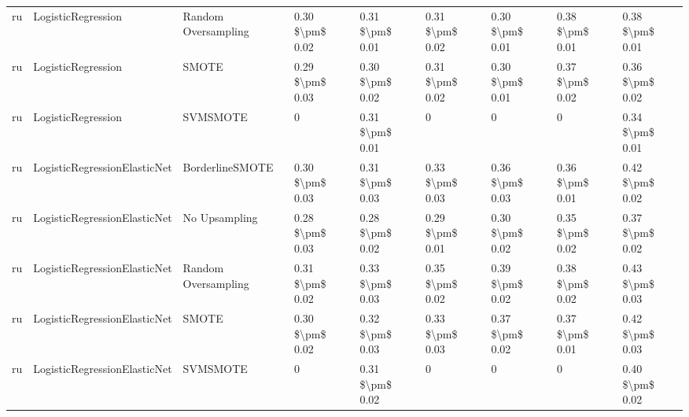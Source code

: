 \begin{tabular}{lllllllll}
      ru &              LogisticRegression &           Random Oversampling & 0.30 \$\textbackslash pm\$ 0.02 &           0.31 \$\textbackslash pm\$ 0.01 &       0.31 \$\textbackslash pm\$ 0.02 &        0.30 \$\textbackslash pm\$ 0.01 &                         0.38 \$\textbackslash pm\$ 0.01 &     0.38 \$\textbackslash pm\$ 0.01 \\
      ru &              LogisticRegression &                         SMOTE & 0.29 \$\textbackslash pm\$ 0.03 &           0.30 \$\textbackslash pm\$ 0.02 &       0.31 \$\textbackslash pm\$ 0.02 &        0.30 \$\textbackslash pm\$ 0.01 &                         0.37 \$\textbackslash pm\$ 0.02 &     0.36 \$\textbackslash pm\$ 0.02 \\
      ru &              LogisticRegression &                      SVMSMOTE &               0 &           0.31 \$\textbackslash pm\$ 0.01 &                     0 &                      0 &                                       0 &     0.34 \$\textbackslash pm\$ 0.01 \\
      ru &    LogisticRegressionElasticNet &               BorderlineSMOTE & 0.30 \$\textbackslash pm\$ 0.03 &           0.31 \$\textbackslash pm\$ 0.03 &       0.33 \$\textbackslash pm\$ 0.03 &        0.36 \$\textbackslash pm\$ 0.03 &                         0.36 \$\textbackslash pm\$ 0.01 &     0.42 \$\textbackslash pm\$ 0.02 \\
      ru &    LogisticRegressionElasticNet &                 No Upsampling & 0.28 \$\textbackslash pm\$ 0.03 &           0.28 \$\textbackslash pm\$ 0.02 &       0.29 \$\textbackslash pm\$ 0.01 &        0.30 \$\textbackslash pm\$ 0.02 &                         0.35 \$\textbackslash pm\$ 0.02 &     0.37 \$\textbackslash pm\$ 0.02 \\
      ru &    LogisticRegressionElasticNet &           Random Oversampling & 0.31 \$\textbackslash pm\$ 0.02 &           0.33 \$\textbackslash pm\$ 0.03 &       0.35 \$\textbackslash pm\$ 0.02 &        0.39 \$\textbackslash pm\$ 0.02 &                         0.38 \$\textbackslash pm\$ 0.02 &     0.43 \$\textbackslash pm\$ 0.03 \\
      ru &    LogisticRegressionElasticNet &                         SMOTE & 0.30 \$\textbackslash pm\$ 0.02 &           0.32 \$\textbackslash pm\$ 0.03 &       0.33 \$\textbackslash pm\$ 0.03 &        0.37 \$\textbackslash pm\$ 0.02 &                         0.37 \$\textbackslash pm\$ 0.01 &     0.42 \$\textbackslash pm\$ 0.03 \\
      ru &    LogisticRegressionElasticNet &                      SVMSMOTE &               0 &           0.31 \$\textbackslash pm\$ 0.02 &                     0 &                      0 &                                       0 &     0.40 \$\textbackslash pm\$ 0.02 \\

\end{tabular}
